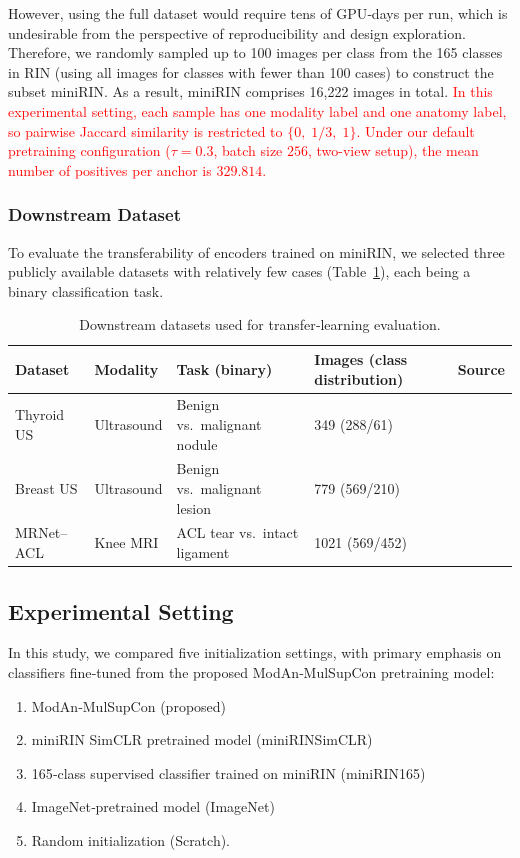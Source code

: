 \documentclass[final,1p,times]{elsarticle}
\newcommand{\revadd}[1]{\textcolor{red}{#1}}
\begin{document}
However, using the full dataset would require tens of GPU‑days per run, which is undesirable from the perspective of reproducibility and design exploration.
Therefore, we randomly sampled up to 100 images per class from the 165 classes in RIN (using all images for classes with fewer than 100 cases)
to construct the subset miniRIN. As a result, miniRIN comprises 16,222 images in total.
\revadd{In this experimental setting, each sample has one modality label and one anatomy label, so pairwise Jaccard similarity is restricted to \(\{0,\;1/3,\;1\}\).}
\revadd{Under our default pretraining configuration (\(\tau=0.3\), batch size \(256\), two-view setup), the mean number of positives per anchor is \(329.814\).}

\subsubsection{Downstream Dataset}
To evaluate the transferability of encoders trained on miniRIN, we selected three publicly available datasets with relatively few cases (Table~\ref{tab:down_ds}), each being a binary classification task.

\begin{table}[h]
    \centering
    \caption{Downstream datasets used for transfer‐learning evaluation.}
    \label{tab:down_ds}
    \begin{tabular}{lllll}
        \toprule
        Dataset & Modality & Task (binary) &  Images (class distribution) & Source \\
        \midrule
        Thyroid US & Ultrasound & Benign vs.~malignant nodule & 349 (288/61) & \cite{pedraza_open_2015} \\
        Breast US  & Ultrasound & Benign vs.~malignant lesion  & 779 (569/210) & \cite{al-dhabyani_dataset_2020} \\
        MRNet–ACL  & Knee MRI   & ACL tear vs.~intact ligament & 1021 (569/452) & \cite{bien_deep-learning-assisted_2018} \\
        \bottomrule
    \end{tabular}
\end{table}

\subsection{Experimental Setting}
In this study, we compared five initialization settings, with primary emphasis on classifiers fine‑tuned from the proposed ModAn‑MulSupCon pretraining model:
\begin{enumerate}
  \item ModAn‑MulSupCon (proposed)
  \item miniRIN SimCLR pretrained model (miniRINSimCLR)
  \item 165‑class supervised classifier trained on miniRIN (miniRIN165)
  \item ImageNet‑pretrained model (ImageNet)
  \item Random initialization (Scratch).
\end{enumerate}
\end{document}
